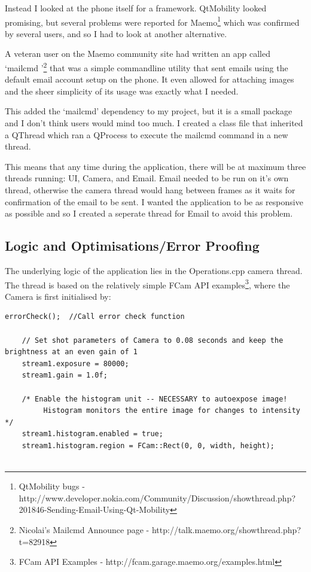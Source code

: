 {{Instead I looked at the phone itself for a framework.  QtMobility looked promising, but several problems were reported for Maemo\footnote{QtMobility bugs - http://www.developer.nokia.com/Community/Discussion/showthread.php?201846-Sending-Email-Using-Qt-Mobility}\label{ref:qtmobbug} which was confirmed by several users, and so I had to look at another alternative.

A veteran user on the Maemo community site had written an app called ‘mailcmd ’\footnote{Nicolai’s Mailcmd Announce page - http://talk.maemo.org/showthread.php?t=82918}\label{ref:mailcmd} that was a simple commandline utility that sent emails using the default email account setup on the phone. It even allowed for attaching images and the sheer simplicity of its usage was exactly what I needed.

This added the ‘mailcmd’ dependency to my project, but it is a small package and I don’t think users would mind too much. I created a class file that inherited a QThread which ran a QProcess to execute the mailcmd command in a new thread.

This means that any time during the application, there will be at maximum three threads running: UI, Camera, and Email. Email needed to be run on it’s own thread, otherwise the camera thread would hang between frames as it waits for confirmation of the email to be sent. I wanted the application to be as responsive as possible and so I created a seperate thread for Email to avoid this problem.

\subsection{Logic and Optimisations/Error Proofing}
The underlying logic of the application lies in the Operations.cpp camera thread. The thread is based on the relatively simple FCam API examples\footnote{FCam API Examples - http://fcam.garage.maemo.org/examples.html}\label{ref:fcamapi}, where the Camera is first initialised by:
\begin{lstlisting}[title=\bf Snippet initialise() function in Operations.cpp]
     errorCheck();  //Call error check function

    // Set shot parameters of Camera to 0.08 seconds and keep the brightness at an even gain of 1
    stream1.exposure = 80000;
    stream1.gain = 1.0f;

    /* Enable the histogram unit -- NECESSARY to autoexpose image!
         Histogram monitors the entire image for changes to intensity */
    stream1.histogram.enabled = true;
    stream1.histogram.region = FCam::Rect(0, 0, width, height); 


\end{lstlisting}}}

